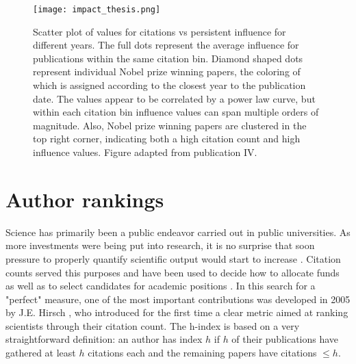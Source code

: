  \begin{figure}[h]
\centering
\texttt{[image: impact\_thesis.png]}%
\caption{Scatter plot of values for citations vs persistent influence for different years. The full dots represent the average influence for publications within the same citation
bin. Diamond shaped dots represent individual Nobel prize winning papers, the coloring of which is assigned according to the closest year to the publication date. The values appear to be correlated by a power law curve, but within
each citation bin influence values can span multiple orders of magnitude. Also, Nobel prize winning papers are clustered in the top right corner, indicating
both a high citation count and high influence values. Figure adapted from publication IV.}
\label{fig:influence}
\end{figure}


\section{Author rankings}

Science has primarily been a public endeavor carried out in public universities. 
As more investments were being
put into research, it is no surprise that soon pressure to properly quantify scientific output would start to increase \cite{Lane2011}.
Citation counts served this purposes and have been used to decide how to allocate funds \cite{Bornmann2005} as well as to select candidates for
academic positions \cite{Boyack2003}. In this search for a "perfect" measure, one of the most important contributions was developed in 2005 by J.E. Hirsch \cite{10.2307/4152261},
who introduced for the first time a clear metric aimed at ranking scientists through their citation count.
The h-index is based on a very straightforward definition: an author has index $h$ if $h$ of their publications have gathered at least $h$ citations each and the remaining
papers have citations $\leq h$. 


